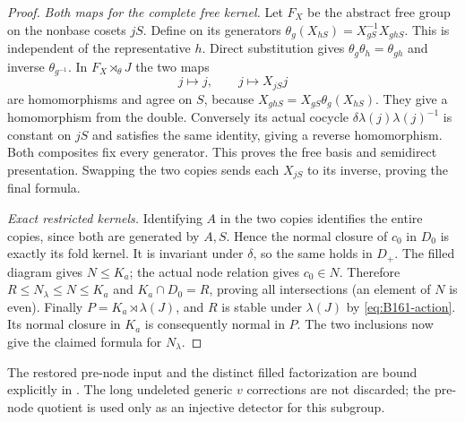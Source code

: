 \begin{proof}
\emph{Both maps for the complete free kernel.}
Let $F_X$ be the abstract free group on the nonbase cosets $jS$.
Define on its generators
$\theta_g(X_{hS})=X_{gS}^{-1}X_{ghS}$. This is independent of the
representative $h$. Direct substitution gives
$\theta_g\theta_h=\theta_{gh}$ and inverse $\theta_{g^{-1}}$.
In $F_X\rtimes_\theta J$ the two maps
\[
 j\longmapsto j,\qquad j\longmapsto X_{jS}j
\]
are homomorphisms and agree on $S$, because
$X_{ghS}=X_{gS}\theta_g(X_{hS})$. They give a homomorphism from
the double. Conversely its actual cocycle $\delta\lambda(j)\lambda(j)^{-1}$
is constant on $jS$ and satisfies the same identity, giving a reverse
homomorphism. Both composites fix every generator. This proves the
free basis and semidirect presentation. Swapping the two copies sends
each $X_{jS}$ to its inverse, proving the final formula.

\emph{Exact restricted kernels.}
Identifying $A$ in the two copies identifies the entire copies, since
both are generated by $A,S$. Hence the normal closure of $c_0$ in
$D_0$ is exactly its fold kernel. It is invariant under $\delta$,
so the same holds in $D_+$. The filled diagram gives $N\le K_a$;
the actual node relation gives $c_0\in N$. Therefore
$R\le N_\lambda\le N\le K_a$ and
$K_a\cap D_0=R$, proving all intersections (an element of $N$ is even).
Finally $P=K_a\rtimes\lambda(J)$, and $R$ is stable under $\lambda(J)$
by \eqref{eq:B161-action}. Its normal closure in $K_a$ is consequently
normal in $P$. The two inclusions now give the claimed formula for
$N_\lambda$.
\end{proof}
The restored pre-node input and the distinct filled factorization are
bound explicitly in .
The long undeleted generic $v$ corrections are not discarded; the
pre-node quotient is used only as an injective detector for this subgroup.
